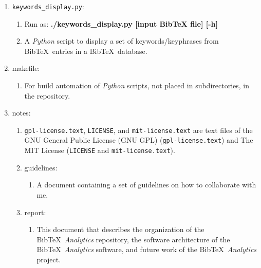 \begin{enumerate}
	\begin{enumerate} \itemsep -2pt
	\item Run as: {\bf ./journal\_titles.py [input BibTeX file] [-h]}
	\item A {\it Python} script to display a set of journal titles from {\sc Bib}\TeX\ entries in a {\sc Bib}\TeX\ database.
	\end{enumerate}
\item {\tt keywords\_display.py}: \vspace{-0.3cm}
	\begin{enumerate} \itemsep -2pt
	\item Run as: {\bf ./keywords\_display.py [input BibTeX file] [-h]}
	\item A {\it Python} script to display a set of keywords/keyphrases from {\sc Bib}\TeX\ entries in a {\sc Bib}\TeX\ database.
	\end{enumerate}
\item makefile: \vspace{-0.3cm}
	\begin{enumerate} \itemsep -2pt
	\item For build automation of {\it Python} scripts, not placed in subdirectories, in the repository.
	\end{enumerate}
\item notes: \vspace{-0.3cm}
	\begin{enumerate} \itemsep -2pt
	\item {\tt gpl-license.text}, {\tt LICENSE}, and {\tt mit-license.text} are text files of the GNU General Public License (GNU GPL) ({\tt gpl-license.text}) and The MIT License ({\tt LICENSE} and {\tt mit-license.text}).
	\item guidelines: \vspace{-0.2cm}
		\begin{enumerate} \itemsep -2pt
		\item A document containing a set of guidelines on how to collaborate with me.
		\end{enumerate}
	\item report: \vspace{-0.2cm}
		\begin{enumerate} \itemsep -2pt
		\item This document that describes the organization of the {\sc Bib}\TeX\ {\it Analytics} repository, the software architecture of the {\sc Bib}\TeX\ {\it Analytics} software, and future work of the {\sc Bib}\TeX\ {\it Analytics} project.
		\end{enumerate}

\end{enumerate}
\end{enumerate}
